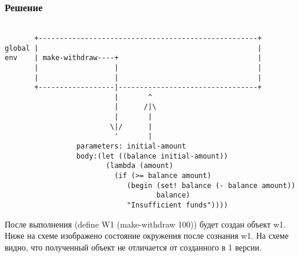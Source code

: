 \documentclass[10pt,a4paper]{article}
\begin{document}
\subsubsection*{Решение}
\newpage
\lstset{ %
basicstyle=\footnotesize,       %
frame=single
}
\begin{lstlisting}

       +----------------------------------------------------+
global |                                                    |
env    | make-withdraw----+                                 |
       |                  |                                 |
       |                  |                                 |
       +------------------|---------------------------------+
                          |       ^
                          |      /|\
                          |       |
                         \|/      |
                          '       |
                 parameters: initial-amount
                 body:(let ((balance initial-amount))
                        (lambda (amount)
                          (if (>= balance amount)
                             (begin (set! balance (- balance amount))
                                    balance)
                             "Insufficient funds"))))

\end{lstlisting}

После выполнения (define W1 (make-withdraw 100)) будет создан объект
w1. Ниже на схеме изображено состояние окружения после сознания w1. На
схеме видно, что полученный объект не отличается от созданного в 1 версии.
\end{document}
